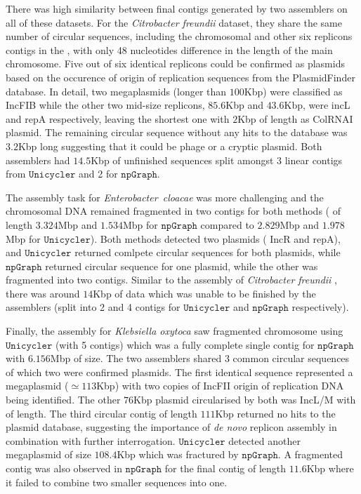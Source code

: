 \documentclass[10pt,letterpaper]{article}
\newcommand{\npgraph}{$\mathtt{npGraph}$}
\newcommand{\unicycler}{$\mathtt{Unicycler}$}
\begin{document}
There was high similarity between final contigs generated by two assemblers on all of these datasets.
For the \emph{Citrobacter freundii}  dataset, they share the same number of circular  sequences, including the chromosomal and other six replicons contigs in the , with only 48 nucleotides  difference in the length of the main chromosome. 
Five out of six identical replicons could be confirmed as plasmids based on the occurence of  origin of replication sequences from  the PlasmidFinder database.
In detail, two megaplasmids (longer than $100$Kbp) were classified as IncFIB while the other two mid-size replicons, $85.6$Kbp and $43.6$Kbp, were incL and repA respectively, leaving the shortest one with $2$Kbp of length as ColRNAI plasmid.
The remaining circular sequence without any hits to the database was $3.2$Kbp long suggesting that it could be phage or a cryptic plasmid. 
Both assemblers had $14.5$Kbp of unfinished sequences split amongst 3 linear contigs from \unicycler{} and 2 for \npgraph{}.

The assembly task for \emph{Enterobacter~cloacae} was more challenging and the chromosomal DNA remained fragmented in two contigs for both methods ( of length $3.324$Mbp and $1.534$Mbp for \npgraph{} compared to $2.829$Mbp and $1.978$Mbp for \unicycler{}). Both methods detected two plasmids ( IncR and repA), and \unicycler{} returned comlpete circular sequences for both plasmids, while \npgraph{} returned circular sequence for one plasmid, while the other was fragmented into two contigs. Similar to the assembly of \emph{Citrobacter freundii} , there was around $14$Kbp of data which was unable to be finished by the assemblers (split into 2 and 4 contigs for \unicycler{} and \npgraph{} respectively). 

Finally, the assembly for \emph{Klebsiella oxytoca} saw fragmented chromosome using \unicycler{} (with 5 contigs) which was a fully complete single contig for \npgraph{} with $6.156$Mbp of size.
The two assemblers shared 3 common circular sequences of which two  were confirmed plasmids. 
The first identical sequence represented a megaplasmid ($\simeq 113$Kbp) with two copies of IncFII origin of replication DNA being identified.  The other $76$Kbp plasmid circularised by both was IncL/M with  of length.
The third circular contig of length $111$Kbp returned no hits to the plasmid database, suggesting the importance of \emph{de novo} replicon assembly in combination with further interrogation.
\unicycler{} detected another megaplasmid of size $108.4$Kbp which was fractured by \npgraph{}. 
A fragmented contig was also observed in \npgraph{} for the final contig of length $11.6$Kbp where it failed to combine two smaller sequences into one.
\end{document}

